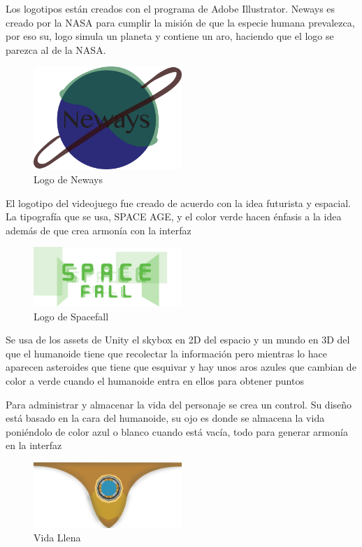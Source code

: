 \documentclass[12pt, conference]{IEEEtran}
\begin{document}
Los logotipos est\'{a}n creados con el programa de Adobe Illustrator. Neways es creado por la NASA para cumplir la misi\'{o}n de que la especie humana prevalezca, por eso su, logo simula un planeta y contiene un aro, haciendo que el logo se parezca al de la NASA.

\begin{figure}[h]
\caption{Logo de Neways}
\centering
\includegraphics[width=0.5\textwidth]{neways}
\end{figure}

El logotipo del videojuego fue creado de acuerdo con la idea futurista y espacial. La tipograf\'{i}a que se usa, SPACE AGE, y el color verde hacen \'{e}nfasis a la idea adem\'{a}s de que crea armon\'{i}a con la interfaz

\begin{figure}[h]
\caption{Logo de Spacefall}
\centering
\includegraphics[width=0.5\textwidth]{spacefall}
\end{figure}

Se usa de los assets de Unity el skybox en 2D del espacio y un mundo en 3D del que el humanoide tiene que recolectar la informaci\'{o}n pero mientras lo hace aparecen asteroides que tiene que esquivar y hay unos aros azules que cambian de color a verde cuando el humanoide entra en ellos para obtener puntos

Para administrar y almacenar la vida del personaje se crea un control. Su dise\~{n}o est\'{a} basado en la cara del humanoide, su ojo es donde se almacena la vida poni\'{e}ndolo de color azul o blanco cuando est\'{a} vac\'{i}a, todo para generar armon\'{i}a en la interfaz

\begin{figure}[h]
\caption{Vida Llena}
\centering
\includegraphics[width=0.5\textwidth]{fulllife}
\end{figure}
\end{document}
